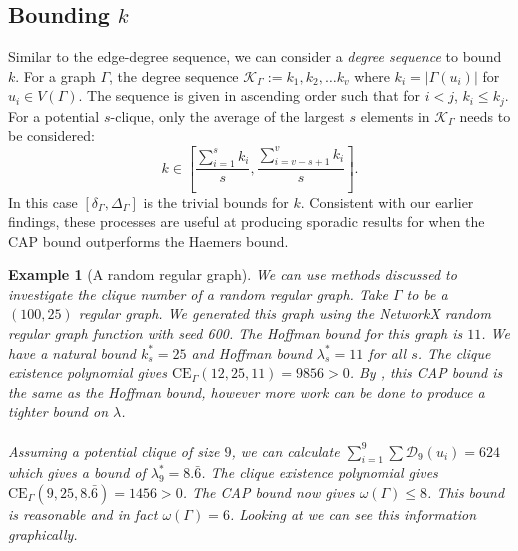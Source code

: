 \documentclass[11pt, baustms]{amsproc}
\theoremstyle{scplain}
\newtheorem*{rexample}{Example}
\newcommand\CE{\mathrm{CE}}
\renewcommand\le{\leqslant}
\begin{document}
\subsection{Bounding $k$}

Similar to the edge-degree sequence, we can consider a \textit{degree sequence} to bound $k$.	For a graph $\Gamma$, the degree sequence $\mathcal{K}_\Gamma := k_1, k_2, \dots k_v$ where $k_i = |\Gamma(u_i)|$ for $u_i \in V(\Gamma)$. The sequence is given in ascending order such that for $i<j$, $k_i \le k_j$. For a potential $s$-clique, only the average of the largest $s$ elements in $\mathcal{K}_\Gamma$ needs to be considered: $$k \in \left[\frac{\sum_{i=1}^s k_i}{s}, \frac{\sum_{i=v-s+1}^v k_i}{s}\right].$$ In this case $\left[\delta_\Gamma, \Delta_\Gamma\right]$ is the trivial bounds for $k$. Consistent with our earlier findings, these processes are useful at producing sporadic results for when the CAP bound outperforms the Haemers bound.



\begin{rexample}[A random regular graph]
We can use methods discussed to investigate the clique number of a random regular graph. Take $\Gamma$ to be a $(100,25)$ regular graph. 
We generated this graph using the NetworkX random regular graph function with seed 600. The Hoffman bound for this graph is $11$. We have a natural bound $k^*_s = 25$ and Hoffman bound $\lambda^*_s=11$ for all $s$. The clique existence polynomial gives $\CE_\Gamma(12, 25, 11) = 9856 > 0$. By , this CAP bound is the same as the Hoffman bound, however more work can be done to produce a tighter bound on $\lambda$.
\\
\\
Assuming a potential clique of size $9$, we can calculate $\sum_{i=1}^{9}\sum \mathcal{D}_9(u_i) = 624$ which gives a bound of $\lambda_9^* = 8.\bar6$. The clique existence polynomial gives $\CE_\Gamma(9, 25,8.\bar6) = 1456 > 0$. The CAP bound now gives $ \omega(\Gamma) \le 8$. This bound is reasonable and in fact $\omega(\Gamma)= 6$. Looking at  we can see this information graphically. 
\end{rexample}
\end{document}
